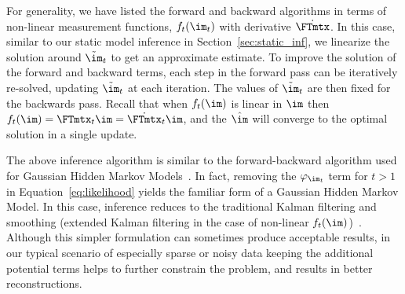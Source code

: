 For generality, we have listed the forward and backward algorithms in terms of non-linear measurement functions, $f_t(\im_t)$ with derivative $\dot{\FTmtx}$. In this case, similar to our static model inference in Section~\ref{sec:static_inf}, we linearize the solution around $\tilde{\im}_t$ to get an approximate estimate. To improve the solution of the forward and backward terms, each step in the forward pass can be iteratively re-solved, updating $\tilde{\im}_t$ at each iteration. The values of $\tilde{\im}_t$ are then fixed for the backwards pass. Recall %
that when $f_t(\im)$ is linear in $\im$ then $f_t(\im) = \FTmtx_t \im  = \dot{\FTmtx}_t \im$, and the $\hat{\im}$ will converge to the optimal solution in a single update.

The above inference algorithm is similar to %
the forward-backward algorithm used for Gaussian Hidden Markov Models~\cite{graphicalmodels}. 
In fact, removing the $\varphi_{\im_t}$ term for $t>1$ in Equation~\ref{eq:likelihood} yields the familiar form of a Gaussian Hidden Markov Model. In this case, inference reduces to the traditional Kalman filtering and smoothing (extended Kalman filtering in the case of non-linear $f_t(\im)$)~\cite{anderson1979optimal}. Although this simpler formulation can sometimes produce acceptable results, in our typical scenario of especially sparse or noisy data keeping the additional potential terms helps to further constrain the problem, and results in better reconstructions. 


